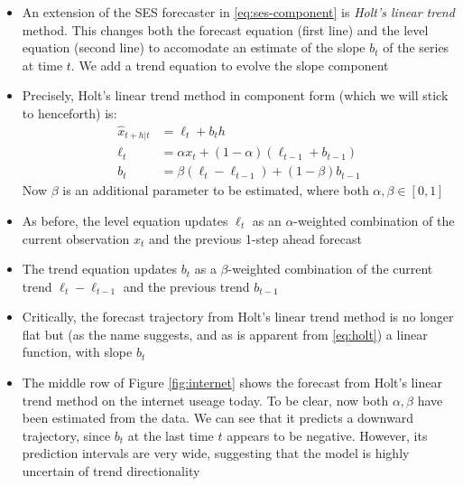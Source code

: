 \documentclass{article}
\begin{document}
\begin{itemize}
\item An extension of the SES forecaster in \eqref{eq:ses-component} is
  \emph{Holt's linear trend} method. This changes both the forecast equation
  (first line) and the level equation (second line) to accomodate an estimate of
  the slope $b_t$ of the series at time $t$. We add a trend equation to evolve
  the slope component 

\item Precisely, Holt's linear trend method in component form (which we will
  stick to henceforth) is:
  \begin{equation}
  \label{eq:holt}
  \begin{aligned}
  \hat{x}_{t+h | t} &= \ell_t + b_t h \\
  \ell_t &= \alpha x_t + (1-\alpha) (\ell_{t-1} + b_{t-1}) \\
  b_t &= \beta (\ell_t - \ell_{t-1}) + (1-\beta) b_{t-1} 
  \end{aligned}
  \end{equation}
  Now $\beta$ is an additional parameter to be estimated, where both $\alpha,
  \beta \in [0,1]$ 

\item As before, the level equation updates $\ell_t$ as an $\alpha$-weighted
  combination of the current observation $x_t$ and the previous 1-step ahead
  forecast  

\item The trend equation updates $b_t$ as a $\beta$-weighted combination of the
  current trend $\ell_t - \ell_{t-1}$ and the previous trend $b_{t-1}$

\item Critically, the forecast trajectory from Holt's linear trend method is no
  longer flat but (as the name suggests, and as is apparent from
  \eqref{eq:holt}) a linear function, with slope $b_t$

\item The middle row of Figure \ref{fig:internet} shows the forecast from Holt's
  linear trend method on the internet useage today. To be clear, now both
  $\alpha,\beta$ have been estimated from the data. We can see that it predicts
  a downward trajectory, since $b_t$ at the last time $t$ appears to be
  negative. However, its prediction intervals are very wide, suggesting that the 
  model is highly uncertain of trend directionality  
\end{itemize}
\end{document}
